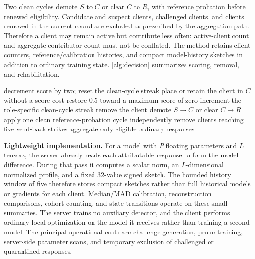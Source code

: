 \documentclass[conference]{IEEEtran}
\begin{document}
Two clean cycles demote $S$ to $C$ or clear $C$ to $R$, with reference probation before renewed eligibility. Candidate and suspect clients, challenged clients, and clients removed in the current round are excluded as prescribed by the aggregation path. Therefore a client may remain active but contribute less often: active-client count and aggregate-contributor count must not be conflated. The method retains client counters, reference/calibration histories, and compact model-history sketches in addition to ordinary training state. \autoref{alg:decision} summarizes scoring, removal, and rehabilitation.

\begin{algorithm}[t]
\caption{Phase IV: suspicion, removal, and rehabilitation}
\label{alg:decision}
\begin{algorithmic}[1]
   \State decrement score by two; reset the clean-cycle streak
   \State place or retain the client in $C$ without a score cost
 \Else
   \State restore 0.5 toward a maximum score of zero
   \State increment the role-specific clean-cycle streak
 \EndIf
   \State remove the client
   \State demote $S\rightarrow C$ or clear $C\rightarrow R$
   \State apply one clean reference-probation cycle
 \EndIf
\EndFor
\State independently remove clients reaching five send-back strikes
\State aggregate only eligible ordinary responses
\end{algorithmic}
\end{algorithm}

\medskip\noindent\textbf{Lightweight implementation.}
For a model with $P$ floating parameters and $L$ tensors, the server already reads each attributable response to form the model difference. During that pass it computes a scalar norm, an $L$-dimensional normalized profile, and a fixed 32-value signed sketch. The bounded history window of five therefore stores compact sketches rather than full historical models or gradients for each client. Median/MAD calibration, reconstruction comparisons, cohort counting, and state transitions operate on these small summaries. The server trains no auxiliary detector, and the client performs ordinary local optimization on the model it receives rather than training a second model. The principal operational costs are challenge generation, probe training, server-side parameter scans, and temporary exclusion of challenged or quarantined responses.
\end{document}

